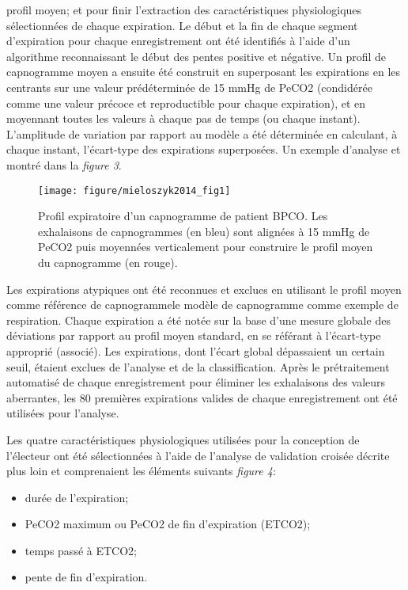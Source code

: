 \documentclass[12pt,]{article}
\providecommand{\tightlist}{%
  \setlength{\itemsep}{0pt}\setlength{\parskip}{0pt}}
\begin{document}
profil moyen; et pour finir l'extraction des caractéristiques
physiologiques sélectionnées de chaque expiration. Le début et la fin de
chaque segment d'expiration pour chaque enregistrement ont été
identifiés à l'aide d'un algorithme reconnaissant le début des pentes
positive et négative. Un profil de capnogramme moyen a ensuite été
construit en superposant les expirations en les centrants sur une valeur
prédéterminée de 15 mmHg de PeCO2 (condidérée comme une valeur précoce
et reproductible pour chaque expiration), et en moyennant toutes les
valeurs à chaque pas de temps (ou chaque instant). L'amplitude de
variation par rapport au modèle a été déterminée en calculant, à chaque
instant, l'écart-type des expirations superposées. Un exemple d'analyse
et montré dans la \emph{figure 3}.

\begin{figure}[h!]

{\centering \texttt{[image: figure/mieloszyk2014\_fig1]} 

}

\caption{Profil expiratoire d'un capnogramme de patient BPCO. Les exhalaisons de capnogrammes (en bleu) sont alignées à 15 mmHg de PeCO2 puis moyennées verticalement pour construire le profil moyen du capnogramme (en rouge).}\label{fig:unnamed-chunk-9}
\end{figure}

Les expirations atypiques ont été reconnues et exclues en utilisant le
profil moyen comme référence de capnogrammele modèle de capnogramme
comme exemple de respiration. Chaque expiration a été notée sur la base
d'une mesure globale des déviations par rapport au profil moyen
standard, en se référant à l'écart-type approprié (associé). Les
expirations, dont l'écart global dépassaient un certain seuil, étaient
exclues de l'analyse et de la classiffication. Après le prétraitement
automatisé de chaque enregistrement pour éliminer les exhalaisons des
valeurs aberrantes, les 80 premières expirations valides de chaque
enregistrement ont été utilisées pour l'analyse.

Les quatre caractéristiques physiologiques utilisées pour la conception
de l'électeur ont été sélectionnées à l'aide de l'analyse de validation
croisée décrite plus loin et comprenaient les éléments suivants
\emph{figure 4}:

\begin{itemize}
\tightlist
\item
  durée de l'expiration;
\item
  PeCO2 maximum ou PeCO2 de fin d'expiration (ETCO2);
\item
  temps passé à ETCO2;
\item
  pente de fin d'expiration.
\end{itemize}
\end{document}
